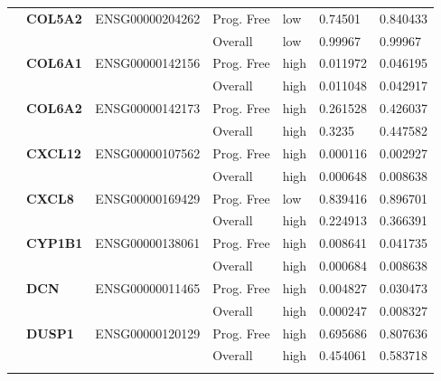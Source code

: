 \begin{spacing}{1}
{\begin{longtable}{%
            |>{\bfseries}p{2cm}|
            >{\bfseries}p{1.9cm}|
            >{\tiny}p{1.9cm}|
            p{2cm}|
            p{2cm}|
            p{1.5cm}|
            p{1.5cm}|
            }
             & COL5A2   & ENSG00000204262 & Prog. Free & low  & 0.74501  & 0.840433 \\
            \hhline{~~~----}
             &          &                 & Overall    & low  & 0.99967  & 0.99967  \\
            \hhline{~======}
             & COL6A1   & ENSG00000142156 & Prog. Free & high & 0.011972 & 0.046195 \\
            \hhline{~~~----}
             &          &                 & Overall    & high & 0.011048 & 0.042917 \\
            \hhline{~======}
             & COL6A2   & ENSG00000142173 & Prog. Free & high & 0.261528 & 0.426037 \\
            \hhline{~~~----}
             &          &                 & Overall    & high & 0.3235   & 0.447582 \\
            \hhline{~======}
             & CXCL12   & ENSG00000107562 & Prog. Free & high & 0.000116 & 0.002927 \\
            \hhline{~~~----}
             &          &                 & Overall    & high & 0.000648 & 0.008638 \\
            \hhline{~======}
             & CXCL8    & ENSG00000169429 & Prog. Free & low  & 0.839416 & 0.896701 \\
            \hhline{~~~----}
             &          &                 & Overall    & high & 0.224913 & 0.366391 \\
            \hhline{~======}
             & CYP1B1   & ENSG00000138061 & Prog. Free & high & 0.008641 & 0.041735 \\
            \hhline{~~~----}
             &          &                 & Overall    & high & 0.000684 & 0.008638 \\
            \hhline{~======}
             & DCN      & ENSG00000011465 & Prog. Free & high & 0.004827 & 0.030473 \\
            \hhline{~~~----}
             &          &                 & Overall    & high & 0.000247 & 0.008327 \\
            \hhline{~======}
             & DUSP1    & ENSG00000120129 & Prog. Free & high & 0.695686 & 0.807636 \\
            \hhline{~~~----}
             &          &                 & Overall    & high & 0.454061 & 0.583718 \\
            \hhline{~======}


\end{longtable}}
\end{spacing}

